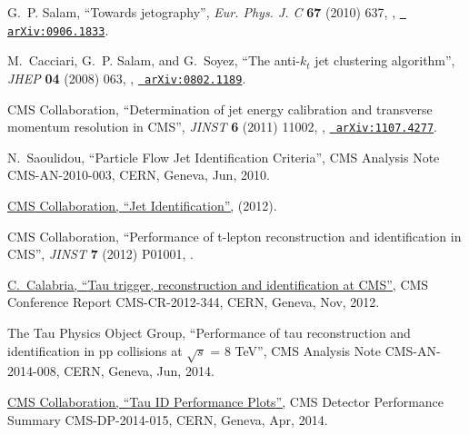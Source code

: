 \documentclass[12pt]{thesis}  %
\begin{document}
\begin{thebibliography}{100}
\hrefCMSnoop {} {G.~P. Salam, ``{Towards jetography}'',} \textit{ Eur. Phys. J.
  C} \textbf{ 67} (2010) 637,
  \href{http://dx.doi.org/10.1140/epjc/s10052-010-1314-6}{},
\href{http://www.arXiv.org/abs/0906.1833}{\texttt{ arXiv:0906.1833}}.

\hrefCMSnoop {} {M.~Cacciari, G.~P. Salam, and G.~Soyez, ``The anti-$k_t$ jet
  clustering algorithm'',} \textit{ JHEP} \textbf{ 04} (2008) 063,
  \href{http://dx.doi.org/10.1088/1126-6708/2008/04/063}{},
  \href{http://www.arXiv.org/abs/0802.1189}{\texttt{ arXiv:0802.1189}}.

\hrefCMSnoop {} {{ CMS} Collaboration, ``Determination of jet energy
  calibration and transverse momentum resolution in CMS'',} \textit{ JINST}
  \textbf{ 6} (2011) 11002,
  \href{http://dx.doi.org/10.1088/1748-0221/6/11/P11002}{},
  \href{http://www.arXiv.org/abs/1107.4277}{\texttt{ arXiv:1107.4277}}.

\hrefCMSnoop {} {N.~Saoulidou, ``Particle Flow Jet Identification Criteria'',}
  CMS Analysis Note CMS-AN-2010-003, CERN, Geneva, Jun, 2010.

\href {https://twiki.cern.ch/twiki/bin/viewauth/CMS/JetID} {{ CMS}
  Collaboration, ``Jet Identification'',} (2012).

\hrefCMSnoop {} {{ CMS} Collaboration, ``Performance of t-lepton reconstruction
  and identification in CMS'',} \textit{ JINST} \textbf{ 7} (2012) P01001,
  \href{http://dx.doi.org/10.1088/1748-0221/7/01/P01001}{}.

\href {https://cds.cern.ch/record/1516071} {C.~Calabria, ``{Tau trigger,
  reconstruction and identification at CMS}'',} CMS Conference Report
  CMS-CR-2012-344, CERN, Geneva, Nov, 2012.

\hrefCMSnoop {} {{The Tau Physics Object Group}, ``Performance of tau
  reconstruction and identification in pp collisions at $\sqrt{s}$ = 8 TeV'',}
  CMS Analysis Note CMS-AN-2014-008, CERN, Geneva, Jun, 2014.

\href {https://cds.cern.ch/record/1704439} {{ CMS} Collaboration, ``{Tau ID
  Performance Plots}'',} CMS Detector Performance Summary CMS-DP-2014-015,
  CERN, Geneva, Apr, 2014.


\end{thebibliography}
\end{document}
